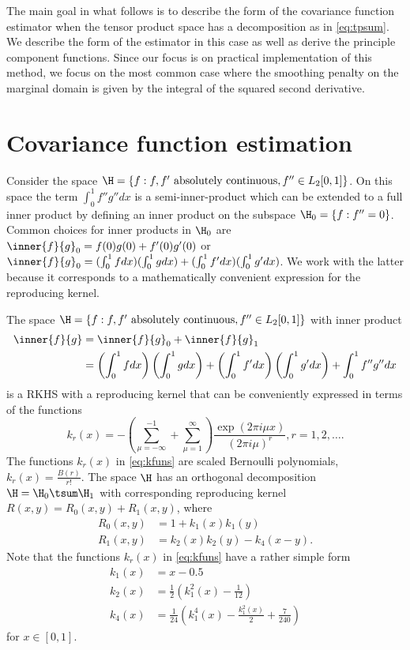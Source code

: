 The main goal in what follows is to describe the form of the covariance function estimator when the tensor product space has a decomposition as in \eqref{eq:tpsum}. We describe the form of the estimator in this case as well as derive the principle component functions. Since our focus is on practical implementation of this method, we focus on the most common case where the smoothing penalty on the marginal domain is given by the integral of the squared second derivative.

 \section{Covariance function estimation} \label{covariance estimation}
  
Consider the space $\H =  \{f : f, f' \mbox{ absolutely continuous}, f'' \in L_2[0,1]\}$. On this space the term $\int_0^1 f''g''dx$ is a semi-inner-product which can be extended to a full inner product by defining an inner product on the subspace $\H_0 = \{f : f'' = 0\}$. Common choices for inner products in $\H_0$ are $\inner{f}{g}_0 = f(0)g(0) + f'(0)g'(0)$ or $\inner{f}{g}_0 = (\int_0^1fdx)(\int_0^1gdx) + (\int_0^1f'dx)(\int_0^1g'dx)$. We work with the latter because it corresponds to a mathematically convenient expression for the reproducing kernel. 
  
  The space $\H =  \{f : f, f' \mbox{ absolutely continuous}, f'' \in L_2[0,1]\}$ with inner product
  \begin{align*}
  \inner{f}{g} &= \inner{f}{g}_0 + \inner{f}{g}_1 \\
  		&= \left(\int_0^1fdx\right)\left(\int_0^1gdx\right) + \left(\int_0^1f'dx\right)\left(\int_0^1g'dx\right) + \int_0^1 f''g''dx
  \end{align*}
  is a RKHS with a reproducing kernel that can be conveniently expressed in terms of the functions
  \begin{equation}
  k_r(x) = -\left( \sum_{\mu = -\infty}^{-1} + \sum_{\mu=1}^{\infty} \right) \frac{\exp(2\pi i \mu x)}{(2 \pi i \mu)^r}, r = 1,2, \dots.
  \label{eq:kfuns}
  \end{equation}
  The functions $k_r(x)$ in \eqref{eq:kfuns} are scaled Bernoulli polynomials, $k_r(x) = \frac{B(r)}{r!}$. The space $\H$ has an orthogonal decomposition $\H = \H_0 \tsum \H_1$ with corresponding reproducing kernel $R(x,y) = R_0(x,y) + R_1(x,y)$, where
  \begin{align}
  R_0(x,y) &= 1 + k_1(x)k_1(y) \\
  R_1(x,y) &= k_2(x)k_2(y) - k_4(x-y).
  \end{align}
  Note that the functions  $k_r(x)$ in \eqref{eq:kfuns}  have a rather simple form
  \begin{align*}
  k_1(x) &= x - 0.5\\
  k_2(x) &= \frac{1}{2}(k_1^2(x) - \frac{1}{12}) \\
  k_4(x) &= \frac{1}{24} \left(k_1^4(x) - \frac{k_1^2(x)}{2} + \frac{7}{240} \right)
  \end{align*}
  for $x \in [0,1]$. 
  

